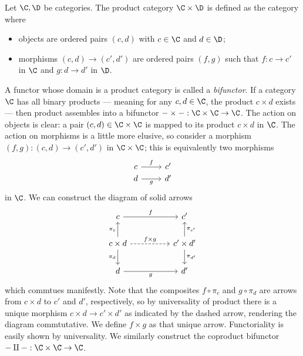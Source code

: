 \begin{definition}\label{A.3.6}
    Let $\C,\D$ be categories. The product category $\C\times\D$ is defined as the category where
    \begin{itemize}
        \item objects are ordered pairs $(c,d)$ with $c\in\C$ and $d\in\D$;
        \item morphisms $(c,d)\to (c',d')$ are ordered pairs $(f,g)$ such that $f : c\to c'$ in $\C$ and $g : d\to d'$ in $\D$.
    \end{itemize}
\end{definition}

\begin{construction}\label{A.3.7}
    A functor whose domain is a product category is called a \emph{bifunctor}. If a category $\C$ has all binary products --- meaning for any $c,d\in\C$, the product $c\times d$ exists --- then product assembles into a bifunctor $-\times - : \C\times\C\to\C$. The action on objects is clear: a pair $(c,d)\in\C\times\C$ is mapped to its product $c\times d$ in $\C$. The action on morphisms is a little more elusive, so consider a morphism $(f,g) : (c,d) \to (c',d')$ in $\C\times\C$; this is equivalently two morphisms
    \[\begin{tikzcd}[row sep=0em]
	c & {c'} \\
	d & {d'}
	\arrow["f", from=1-1, to=1-2]
	\arrow["g"', from=2-1, to=2-2]
    \end{tikzcd}\]
    in $\C$. We can construct the diagram of solid arrows
    \[\begin{tikzcd}
	c && {c'} \\
	{c\times d} && {c'\times d'} \\
	d && {d'}
	\arrow["f", from=1-1, to=1-3]
	\arrow["{\pi_c}", from=2-1, to=1-1]
	\arrow["{f\times g}", dashed, from=2-1, to=2-3]
	\arrow["{\pi_d}"', from=2-1, to=3-1]
	\arrow["{\pi_{c'}}"', from=2-3, to=1-3]
	\arrow["{\pi_{d'}}", from=2-3, to=3-3]
	\arrow["g"', from=3-1, to=3-3]
    \end{tikzcd}\]
    which commtues manifestly. Note that the composites $f\circ \pi_c$ and $g\circ \pi_d$ are arrows from $c\times d$ to $c'$ and $d'$, respectively, so by universality of product there is a unique morphism $c\times d \to c'\times d'$ as indicated by the dashed arrow, rendering the diagram commtutative. We define $f\times g$ as that unique arrow. Functoriality is easily shown by universality. We similarly construct the coproduct bifunctor $-\amalg - : \C\times\C \to\C$.
\end{construction}


